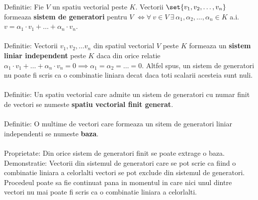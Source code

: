 \documentclass{article}
\begin{document}
        Definitie: Fie $V$ un spatiu vectorial peste $K$. Vectorii $\set{ v_{1}, v_2, \dots, v_{n}}$ formeaza \textbf{sistem de generatori} pentru $V$ $\iff
        \forall\ v \in V\ \exists\ \alpha_{1}, \alpha_{2}, \dots , \alpha_{n}\in K$ a.i. $v = \alpha_{1} \cdot v_{1} + \dots + \alpha_{n} \cdot v_{n}$. \\ \\
        Definitie: Vectorii $v_{1}, v_{2}, \dots v_{n}$ din spatiul vectorial $V$ peste $K$ formeaza un \textbf{sistem liniar independent} peste $K$ daca din
        orice relatie $\alpha_{1} \cdot v_{1} + \dots + \alpha_{n} \cdot v_{n} = 0 \implies \alpha_{1} = \alpha_{2} = \dots = 0$. Altfel spus, un sistem de
        generatori nu poate fi scris ca o combinatie liniara decat daca toti scalarii acesteia sunt nuli. \\ \\
        Definitie: Un spatiu vectorial care admite un sistem de generatori cu numar finit de vectori se numeste \textbf{spatiu vectorial finit generat}. \\ \\
        Definitie: O multime de vectori care formeaza un sitem de generatori liniar independenti se numeste \textbf{baza}. \\ \\
        Proprietate: Din orice sistem de generatori finit se poate extrage o baza.\\
        Demonstratie: Vectorii din sistemul de generatori care se pot scrie ca fiind o combinatie liniara a celorlalti vectori se pot exclude din sistemul de generatori. Procedeul poate sa fie continuat pana in momentul in care nici unul dintre vectori nu mai poate fi scris ca o combinatie liniara a celorlalti.
\end{document}

